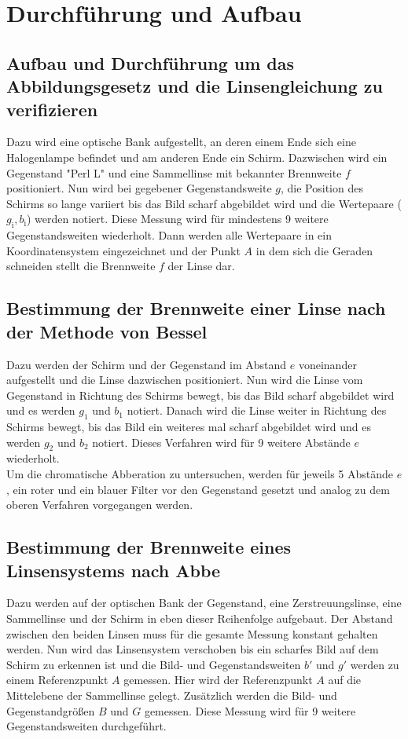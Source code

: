 \section{Durchführung und Aufbau}
\label{sec:Durchführung}

\subsection{Aufbau und Durchführung um das Abbildungsgesetz und die Linsengleichung zu verifizieren}
Dazu wird eine optische Bank aufgestellt, an deren einem Ende sich eine Halogenlampe befindet und am anderen Ende ein Schirm. Dazwischen wird ein Gegenstand "Perl L" und eine Sammellinse mit bekannter Brennweite $f$ positioniert. Nun wird bei gegebener Gegenstandsweite $g$, die Position des Schirms so lange variiert bis das Bild scharf abgebildet wird und die Wertepaare ($g_\text{i}, b_\text{i}$) werden notiert. Diese Messung wird für mindestens 9 weitere Gegenstandsweiten wiederholt. Dann werden alle Wertepaare in ein Koordinatensystem eingezeichnet und der Punkt $A$ in dem sich die Geraden schneiden stellt die Brennweite $f$ der Linse dar.

\subsection{Bestimmung der Brennweite einer Linse nach der Methode von Bessel}
Dazu werden der Schirm und der Gegenstand im Abstand $e$ voneinander aufgestellt und die Linse dazwischen positioniert. Nun wird die Linse vom Gegenstand in Richtung des Schirms bewegt, bis das Bild scharf abgebildet wird und es werden $g_1$ und $b_1$ notiert. Danach wird die Linse weiter in Richtung des Schirms bewegt, bis das Bild ein weiteres mal scharf abgebildet wird und es werden $g_2$ und $b_2$ notiert. Dieses Verfahren wird für 9 weitere Abstände $e$ wiederholt. \\
Um die chromatische Abberation zu untersuchen, werden für jeweils 5 Abstände $e$, ein roter und ein blauer Filter vor den Gegenstand gesetzt und analog zu dem oberen Verfahren vorgegangen werden.

\subsection{Bestimmung der Brennweite eines Linsensystems nach Abbe}
Dazu werden auf der optischen Bank der Gegenstand, eine Zerstreuungslinse, eine Sammellinse und der Schirm in eben dieser Reihenfolge aufgebaut. Der Abstand zwischen den beiden Linsen muss für die gesamte Messung konstant gehalten werden. Nun wird das Linsensystem verschoben bis ein scharfes Bild auf dem Schirm zu erkennen ist und die Bild- und Gegenstandsweiten $b'$ und $g'$ werden zu einem Referenzpunkt $A$ gemessen. Hier wird der Referenzpunkt $A$ auf die Mittelebene der Sammellinse gelegt. Zusätzlich werden die Bild- und Gegenstandgrößen $B$ und $G$ gemessen. Diese Messung wird für 9 weitere Gegenstandsweiten durchgeführt.
